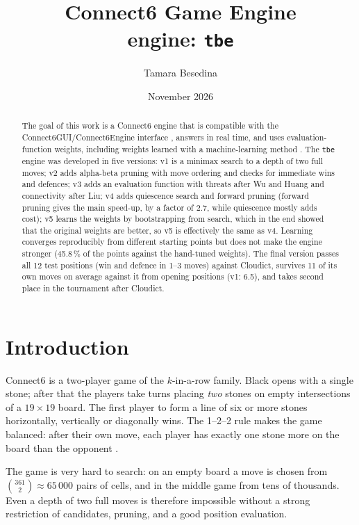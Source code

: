 \documentclass[a4paper,10pt,twocolumn]{article}
\title{\textbf{Connect6 Game Engine}\\[0.3em]\large engine: \texttt{tbe}}
\author{Tamara Besedina}
\date{November 2026}
\newcommand{\code}[1]{\texttt{#1}}
\begin{document}
\maketitle
\begin{abstract}
\noindent
The goal of this work is a Connect6 engine that is compatible with the Connect6GUI/\allowbreak{}Connect6Engine interface \citep{connect6gui}, answers in real time, and uses evaluation-function weights, including weights learned with a machine-learning method \citep{statement}. The \code{tbe} engine was developed in five versions: v1 is a minimax search to a depth of two full moves; v2 adds alpha-beta pruning with move ordering and checks for immediate wins and defences; v3 adds an evaluation function with threats after Wu and Huang and connectivity after Liu; v4 adds quiescence search and forward pruning (forward pruning gives the main speed-up, by a factor of 2.7, while quiescence mostly adds cost); v5 learns the weights by bootstrapping from search, which in the end showed that the original weights are better, so v5 is effectively the same as v4. Learning converges reproducibly from different starting points but does not make the engine stronger (45.8\,\% of the points against the hand-tuned weights). The final version passes all 12 test positions (win and defence in 1--3 moves) against Cloudict, survives 11 of its own moves on average against it from opening positions (v1: 6.5), and takes second place in the tournament after Cloudict.
\end{abstract}

\section{Introduction}

Connect6 is a two-player game of the $k$-in-a-row family. Black opens with a single stone; after that the players take turns placing \emph{two} stones on empty intersections of a $19\times19$ board. The first player to form a line of six or more stones horizontally, vertically or diagonally wins. The 1--2--2 rule makes the game balanced: after their own move, each player has exactly one stone more on the board than the opponent \citep{wu2005family}.

The game is very hard to search: on an empty board a move is chosen from $\binom{361}{2}\approx 65\,000$ pairs of cells, and in the middle game from tens of thousands. Even a depth of two full moves is therefore impossible without a strong restriction of candidates, pruning, and a good position evaluation.
\end{document}
